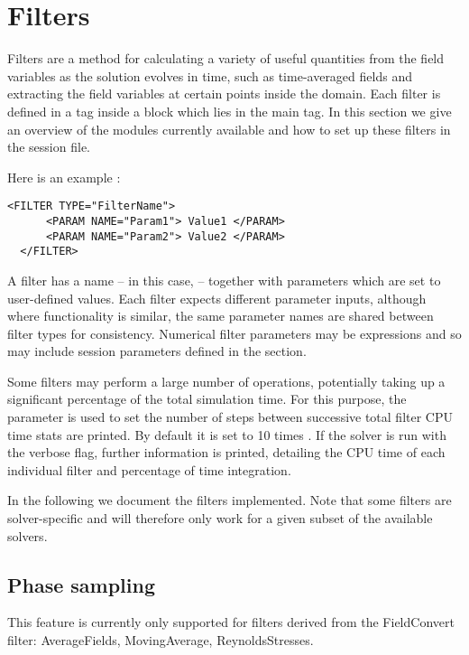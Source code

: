 \section{Filters}\label{filters}

Filters are a method for calculating a variety of useful quantities from the
field variables as the solution evolves in time, such as time-averaged fields
and extracting the field variables at certain points inside the domain. Each
filter is defined in a  tag inside a  block which
lies in the main  tag. In this section we give an overview of the
modules currently available and how to set up these filters in the session file.

Here is an example :

\begin{lstlisting}[style=XMLStyle,gobble=2]
  <FILTER TYPE="FilterName">
      <PARAM NAME="Param1"> Value1 </PARAM>
      <PARAM NAME="Param2"> Value2 </PARAM>
  </FILTER>
\end{lstlisting}

A filter has a name -- in this case,  -- together with
parameters which are set to user-defined values. Each filter expects different
parameter inputs, although where functionality is similar, the same parameter
names are shared between filter types for consistency. Numerical filter
parameters may be expressions and so may include session parameters defined in
the  section.

Some filters may perform a large number of operations, potentially taking up
a significant percentage of the total simulation time. For this purpose,
the parameter  is used to set the number of steps
between successive total filter CPU time stats are printed. By default it is
set to 10 times . If the solver is run with the verbose
 flag, further information is printed, detailing the CPU time of each
individual filter and percentage of time integration.

In the following we document the filters implemented. Note that some filters are
solver-specific and will therefore only work for a given subset of the available
solvers.

\subsection{Phase sampling}
\begin{notebox}
  This feature is currently only supported for filters derived from the
  FieldConvert filter: AverageFields, MovingAverage, ReynoldsStresses.
\end{notebox}

